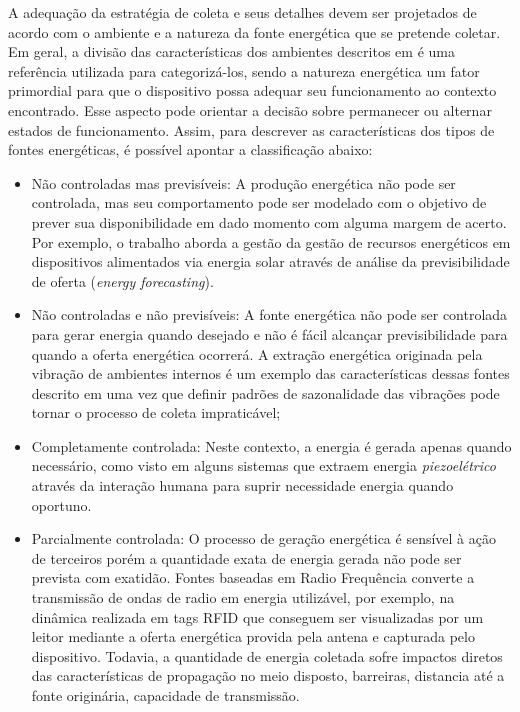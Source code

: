  A adequação da estratégia de coleta e seus detalhes devem ser projetados de acordo com o ambiente e a natureza da fonte energética que se pretende coletar. Em geral, a divisão das características dos ambientes descritos em \cite{shaikh_energy_2016} é uma referência utilizada para categorizá-los, sendo a natureza energética um fator primordial para que o dispositivo possa adequar seu funcionamento ao contexto encontrado. Esse aspecto pode orientar a decisão sobre permanecer ou alternar estados de funcionamento. Assim, para descrever as características dos tipos de fontes energéticas, é possível apontar a classificação abaixo:

\begin{itemize}

    \item Não controladas mas previsíveis: A produção energética não pode ser controlada, mas seu comportamento pode ser modelado com o objetivo de prever sua disponibilidade em dado momento com alguma margem de acerto. Por exemplo, o trabalho  \cite{lee_energy_2018} aborda a gestão da gestão de recursos energéticos em dispositivos alimentados via energia solar através de análise da previsibilidade de oferta (\textit{energy forecasting}).
    
    
    \item Não controladas e não previsíveis: A fonte energética não pode ser controlada para gerar energia quando desejado e não é fácil alcançar previsibilidade para quando a oferta energética ocorrerá. A extração energética originada pela vibração de ambientes internos é um exemplo das características dessas fontes descrito em \cite{wei_comprehensive_2017} uma vez que definir padrões de sazonalidade das vibrações pode tornar o processo de coleta impraticável;
    
    \item Completamente controlada: Neste contexto, a energia é gerada apenas quando necessário, como visto em alguns sistemas que extraem energia \textit{piezoelétrico} através da interação humana para suprir necessidade energia quando oportuno.
    
    \item Parcialmente controlada: O processo de geração energética é sensível à ação de terceiros porém a quantidade exata de energia gerada não pode ser prevista com exatidão. Fontes baseadas em Radio Frequência converte a transmissão de ondas de radio em energia utilizável, por exemplo, na dinâmica realizada em tags \acf{RFID} que conseguem ser visualizadas por um leitor mediante a oferta energética provida pela antena e capturada pelo dispositivo. Todavia, a quantidade de energia coletada sofre impactos diretos das características de propagação no meio disposto, barreiras, distancia até a fonte originária, capacidade de transmissão.
\end{itemize}

